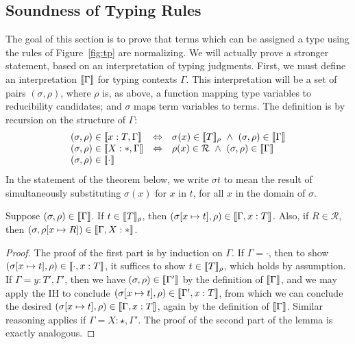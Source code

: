 \documentclass{article}
\begin{document}
\subsection{Soundness of Typing Rules}

The goal of this section is to prove that terms which can be assigned
a type using the rules of Figure~\ref{fig:tp} are normalizing.  We
will actually prove a stronger statement, based on an interpretation
of typing judgments.  First, we must define an interpretation
$\llbracket \Gamma \rrbracket$ for typing contexts $\Gamma$.  This interpretation
will be a set of pairs $(\sigma,\rho)$, where $\rho$ is, as above, a
function mapping type variables to reducibility candidates; and
$\sigma$ maps term variables to terms.  The definition is by recursion
on the structure of $\Gamma$:
\[
\begin{array}{lll}
(\sigma,\rho)\in\llbracket x:T,\Gamma \rrbracket & \Leftrightarrow & \sigma(x)\in\llbracket T \rrbracket_\rho \ \wedge\ (\sigma,\rho)\in\llbracket \Gamma \rrbracket \\
(\sigma,\rho)\in\llbracket X:*,\Gamma \rrbracket & \Leftrightarrow & \rho(x)\in\mathcal{R}\ \wedge\ (\sigma,\rho)\in\llbracket \Gamma \rrbracket \\
(\sigma,\rho)\in\llbracket \cdot \rrbracket
\end{array}
\]
In the statement of the theorem below, we write $\sigma t$ to mean the
result of simultaneously substituting $\sigma(x)$ for $x$ in $t$, for
all $x$ in the domain of $\sigma$.

\vspace{0.25cm}
\begin{lemma}
\label{lem:ctxtext}
  Suppose $(\sigma,\rho)\in\llbracket \Gamma \rrbracket$.  If
  $t\in\llbracket T \rrbracket_\rho$, then $(\sigma[x\mapsto
  t],\rho)\in\llbracket \Gamma,x:T \rrbracket$.  Also, if $R\in\mathcal{R}$, then
  $(\sigma,\rho[x\mapsto R])\in\llbracket \Gamma,X:* \rrbracket$.
\end{lemma}
\begin{proof}
  The proof of the first part is by induction on $\Gamma$. If $\Gamma
  = \cdot$, then to show $(\sigma[x\mapsto
  t],\rho)\in\llbracket \cdot,x:T \rrbracket$, it suffices to show
  $t\in\llbracket T \rrbracket_\rho$, which holds by assumption.  If $\Gamma =
  y:T',\Gamma'$, then we have $(\sigma,\rho)\in\llbracket \Gamma' \rrbracket$ by
  the definition of $\llbracket \Gamma \rrbracket$, and we may apply the IH to
  conclude $(\sigma[x\mapsto t],\rho)\in\llbracket \Gamma',x:T \rrbracket$, from
  which we can conclude the desired $(\sigma[x\mapsto
  t],\rho)\in\llbracket \Gamma,x:T \rrbracket$, again by the definition of
  $\llbracket \Gamma \rrbracket$.  Similar reasoning applies if $\Gamma =
  X:\star,\Gamma'$.  The proof of the second part of the lemma
  is exactly analogous.
\end{proof}
\end{document}
